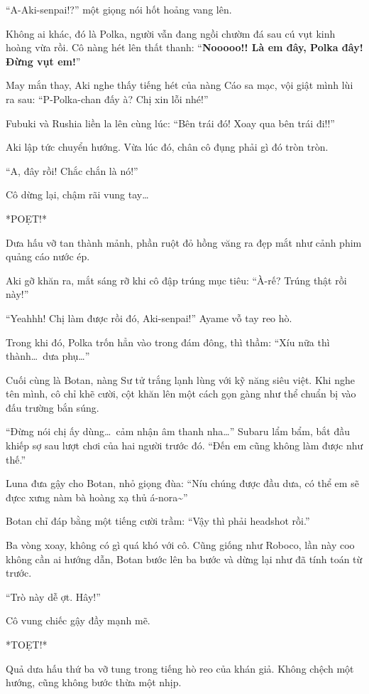 \documentclass[../main.tex]{subfiles}
\begin{document}
``A-Aki-senpai!?'' một giọng nói hốt hoảng vang lên.

Không ai khác, đó là Polka, người vẫn đang ngồi chườm đá sau cú vụt kinh hoàng vừa rồi. Cô nàng hét lên thất thanh: ``\textbf{Nooooo!! Là em đây, Polka đây! Đừng vụt em!}''

May mắn thay, Aki nghe thấy tiếng hét của nàng Cáo sa mạc, vội giật mình lùi ra sau: ``P-Polka-chan đấy à? Chị xin lỗi nhé!''

Fubuki và Rushia liền la lên cùng lúc: ``Bên trái đó! Xoay qua bên trái đi!!''

Aki lập tức chuyển hướng. Vừa lúc đó, chân cô đụng phải gì đó tròn tròn.

``A, đây rồi! Chắc chắn là nó!''

Cô dừng lại, chậm rãi vung tay\dots

*POẸT!*

Dưa hấu vỡ tan thành mảnh, phần ruột đỏ hồng văng ra đẹp mắt như cảnh phim quảng cáo nước ép.

Aki gỡ khăn ra, mắt sáng rỡ khi cô đập trúng mục tiêu: ``À-rế? Trúng thật rồi này!''

``Yeahhh! Chị làm được rồi đó, Aki-senpai!'' Ayame vỗ tay reo hò.

Trong khi đó, Polka trốn hẳn vào trong đám đông, thì thầm: ``Xíu nữa thì thành\dots\ dưa phụ\dots''

\ct

Cuối cùng là Botan, nàng Sư tử trắng lạnh lùng với kỹ năng siêu việt. Khi nghe tên mình, cô chỉ khẽ cười, cột khăn lên một cách gọn gàng như thể chuẩn bị vào đấu trường bắn súng.

``Đừng nói chị ấy dùng\dots\ cảm nhận âm thanh nha\dots'' Subaru lẩm bẩm, bắt đầu khiếp sợ sau lượt chơi của hai người trước đó. ``Đến em cũng không làm được như thế.''

Luna đưa gậy cho Botan, nhỏ giọng đùa: ``Níu chúng được đầu dưa, có thể em sẽ đựcc xưng nàm bà hoàng xạ thủ á-nora\~{}''

Botan chỉ đáp bằng một tiếng cười trầm: ``Vậy thì phải headshot rồi.''

Ba vòng xoay, không có gì quá khó với cô. Cũng giống như Roboco, lần này coo không cần ai hướng dẫn, Botan bước lên ba bước và dừng lại như đã tính toán từ trước.

``Trò này dễ ợt. Hây!''

Cô vung chiếc gậy đầy mạnh mẽ.

*TOẸT!*

Quả dưa hấu thứ ba vỡ tung trong tiếng hò reo của khán giả. Không chệch một hướng, cũng không bước thừa một nhịp.
\end{document}
